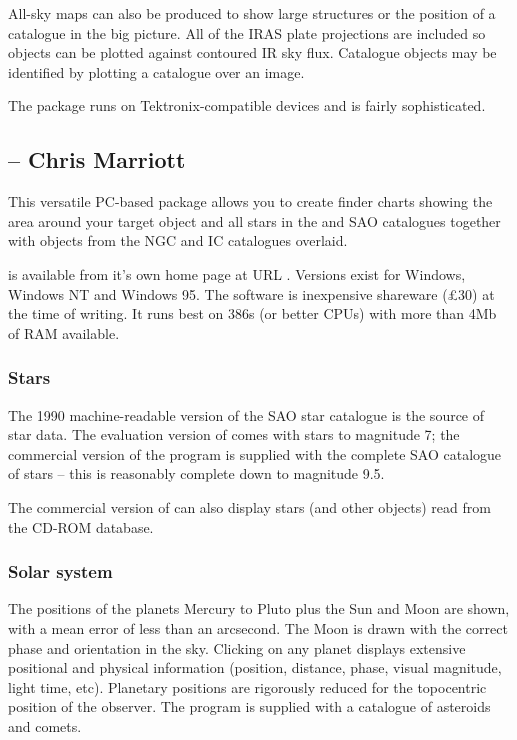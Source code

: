 All-sky maps can also be produced to show large structures or
the position of a catalogue in the big picture. All of the IRAS plate projections
 are included so objects can be plotted
against contoured IR sky flux. Catalogue objects may be identified by 
plotting a catalogue over an image.

The package runs on Tektronix-compatible devices and is fairly sophisticated. 


\subsection{{\SKYMAPPCref} -- Chris Marriott} 
\label{sec:skymappc}

This versatile PC-based package allows you to create finder charts showing
the area around your target object and all stars in the {\GSCref} and SAO
catalogues together with objects from the NGC and IC catalogues overlaid. 

{\SKYMAPPCref} is available from it's own home page at 
URL {\HTTPCref}. Versions exist for Windows, Windows NT and Windows 95. 
The software is inexpensive shareware (\pounds 30) at the time
of writing. It runs best on 386s (or better CPUs) with more than 4Mb of RAM
available. 


\subsubsection{Stars} 

The 1990 machine-readable version of the SAO star catalogue is the source of
star data. The evaluation version of {\SKYMAPPCref} comes with stars to magnitude 7;
the commercial version of the program is supplied with the complete SAO
catalogue of stars -- this is reasonably complete down to magnitude 9.5.

The commercial version of {\SKYMAPPCref} can also display stars (and other objects)
read from the {\GSCref} CD-ROM database.

\subsubsection{Solar system} 

The positions of the planets Mercury to Pluto plus the Sun and Moon are
shown, with a mean error of less than an arcsecond. The Moon is drawn with
the correct phase and orientation in the sky. Clicking on any planet displays
extensive positional and physical information (position, distance, phase,
visual magnitude, light time, etc). Planetary positions are rigorously
reduced for the topocentric position of the observer. 
The program is supplied with a catalogue of asteroids and comets.

